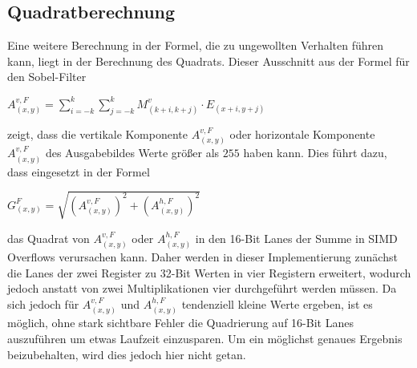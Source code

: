 \documentclass[course=asp]{aspdoc}
\begin{document}
\subsection{Quadratberechnung}\label{Quadratberechnung}
Eine weitere Berechnung in der Formel, die zu ungewollten Verhalten führen kann, liegt in der Berechnung des Quadrats. Dieser Ausschnitt aus der Formel für den Sobel-Filter
\begin{center}
$A_{(x,y)}^{v,F}=\displaystyle\sum_{i=-k}^{k}\displaystyle\sum_{j=-k}^{k}M_{(k+i,k+j)}^{v}\cdot E_{(x+i,y+j)}$
\end{center}
zeigt, dass die vertikale Komponente $A_{(x,y)}^{v,F}$ oder horizontale Komponente $A_{(x,y)}^{v,F}$ des Ausgabebildes Werte größer als $255$ haben kann. Dies führt dazu, dass eingesetzt in der Formel
\begin{center}
$G_{(x,y)}^{F}=\sqrt{(A_{(x,y)}^{v,F})^{2}+(A_{(x,y)}^{h,F})^{2}}$
\end{center}
das Quadrat von $A_{(x,y)}^{v,F}$ oder $A_{(x,y)}^{h,F}$ in den 16-Bit Lanes der Summe in SIMD Overflows verursachen kann. Daher werden in dieser Implementierung zunächst die Lanes der zwei Register zu 32-Bit Werten in vier Registern erweitert, wodurch jedoch anstatt von zwei Multiplikationen vier durchgeführt werden müssen. Da sich jedoch für $A_{(x,y)}^{v,F}$ und $A_{(x,y)}^{h,F}$ tendenziell kleine Werte ergeben, ist es möglich, ohne stark sichtbare Fehler die Quadrierung auf 16-Bit Lanes auszuführen um etwas Laufzeit einzusparen. Um ein möglichst genaues Ergebnis beizubehalten, wird dies jedoch hier nicht getan.\\
\end{document}
